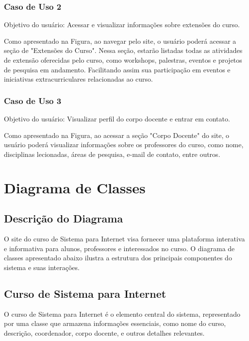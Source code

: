 \documentclass[a4paper,12pt]{report}
\begin{document}
\subsubsection{Caso de Uso 2}
 
Objetivo do usuário: Acessar e visualizar informações sobre extensões do curso.
 
Como apresentado na Figura, ao navegar pelo site, o usuário poderá acessar a seção de "Extensões do Curso". Nessa seção, estarão listadas todas as atividades de extensão oferecidas pelo curso, como workshops, palestras, eventos e projetos de pesquisa em andamento. Facilitando assim sua participação em eventos e iniciativas extracurriculares relacionadas ao curso.
 
\subsubsection{Caso de Uso 3}
 
Objetivo do usuário: Visualizar perfil do corpo docente e entrar em contato.
 
Como apresentado na Figura, ao acessar a seção "Corpo Docente" do site, o usuário poderá visualizar informações sobre os professores do curso, como nome, disciplinas lecionadas, áreas de pesquisa, e-mail de contato, entre outros.

\section{Diagrama de Classes}
 
\subsection{Descrição do Diagrama}
 
O site do curso de Sistema para Internet visa fornecer uma plataforma interativa e informativa para alunos, professores e interessados no curso. O diagrama de classes apresentado abaixo ilustra a estrutura dos principais componentes do sistema e suas interações.
 
\subsection{Curso de Sistema para Internet}
 
O curso de Sistema para Internet é o elemento central do sistema, representado por uma classe que armazena informações essenciais, como nome do curso, descrição, coordenador, corpo docente, e outros detalhes relevantes.
 
\end{document}
